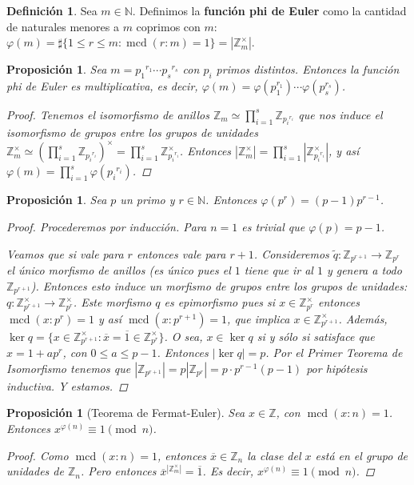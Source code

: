 \documentclass[12pt]{book}
\newtheorem{prop}[teo]{Proposición}
\theoremstyle{definition}
\newtheorem{defn}[teo]{Definición}
\newcommand{\ZZ}{\mathbb{Z}}      %
\newcommand{\NN}{\mathbb{N}}
\DeclareMathOperator{\mcd}{mcd}
\begin{document}
\begin{defn}
Sea $m\in\NN$. Definimos la \textbf{función phi de Euler} como la cantidad de naturales menores a $m$ coprimos con $m$: $\varphi (m) = \sharp \{1\leq r\leq m : \mcd(r:m)=1\} = |\ZZ_m^\times|$.
\end{defn}

\begin{prop}
Sea $m={p_1}^{r_1}\cdots {p_s}^{r_s}$ con $p_i$ primos distintos. Entonces la función phi de Euler es multiplicativa, es decir, $\varphi(m) = \varphi(p_1^{r_1})\cdots \varphi(p_s^{r_s})$.
\begin{proof}
Tenemos el isomorfismo de anillos $\ZZ_m \simeq \displaystyle\prod_{i=1}^s \ZZ_{{p_i}^{r_i}}$ que nos induce el isomorfismo de grupos entre los grupos de unidades $\ZZ_m^\times \simeq \left(\displaystyle\prod_{i=1}^s \ZZ_{{p_i}^{r_i}}\right)^\times = \displaystyle\prod_{i=1}^s \ZZ_{{p_i}^{r_i}}^\times$. Entonces $|\ZZ_m^\times| = \displaystyle\prod_{i=1}^s |\ZZ_{{p_i}^{r_i}}^\times|$, y así $\varphi(m) = \displaystyle\prod_{i=1}^s \varphi({p_i}^{r_i})$.
\end{proof}
\end{prop}

\begin{prop}
Sea $p$ un primo y $r\in\NN$. Entonces $\varphi(p^r) = (p-1)p^{r-1}$.
\begin{proof}
Procederemos por inducción. Para $n=1$ es trivial que $\varphi(p)=p-1$.

Veamos que si vale para $r$ entonces vale para $r+1$. Consideremos $\tilde{q}:\ZZ_{p^{r+1}}\to \ZZ_{p^r}$ el único morfismo de anillos (es único pues el $1$ tiene que ir al $1$ y genera a todo $\ZZ_{p^{r+1}}$). Entonces esto induce un morfismo de grupos entre los grupos de unidades: $q:\ZZ_{p^{r+1}}^\times \to \ZZ_{p^r}^\times$. Este morfismo $q$ es epimorfismo pues si $x\in \ZZ_{p^r}^\times$ entonces $\mcd(x:p^r)=1$ y así $\mcd(x:p^{r+1})=1$, que implica $x\in \ZZ_{p^{r+1}}^\times$. Además, $\ker q = \{x\in \ZZ_{p^{r+1}}^\times : \overline{x}=\overline{1}\in\ZZ_{p^r}^\times\}$. O sea, $x\in \ker q$ si y sólo si satisface que $x=1+ap^r$, con $0\leq a\leq p-1$. Entonces $|\ker q| = p$. Por el Primer Teorema de Isomorfismo tenemos que $|\ZZ_{p^{r+1}}| = p |\ZZ_{p^r}|=p\cdot p^{r-1}(p-1)$ por hipótesis inductiva. Y estamos.
\end{proof}
\end{prop}
\begin{prop}[Teorema de Fermat-Euler]

Sea $x\in\ZZ$, con $\mcd(x:n)=1$. Entonces $x^{\varphi(n)}\equiv 1\pmod{n}$.
\begin{proof}
Como $\mcd(x:n)=1$, entonces $\overline{x}\in\ZZ_n$ la clase del $x$ está en el grupo de unidades de $\ZZ_n$. Pero entonces $\overline{x}^{|\ZZ_m^\times|} = \overline{1}$. Es decir, $x^{\varphi(n)}\equiv 1\pmod{n}$.
\end{proof}
\end{prop}
\end{document}
